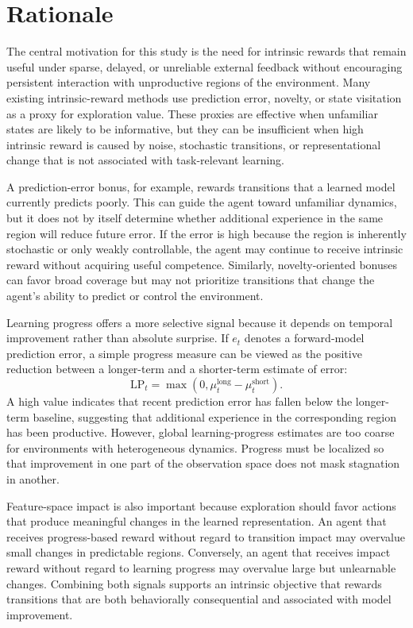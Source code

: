 \section{Rationale}
\label{sec:rationale}

The central motivation for this study is the need for intrinsic rewards that remain useful under sparse, delayed, or unreliable external feedback without encouraging persistent interaction with unproductive regions of the environment.
Many existing intrinsic-reward methods use prediction error, novelty, or state visitation as a proxy for exploration value.
These proxies are effective when unfamiliar states are likely to be informative, but they can be insufficient when high intrinsic reward is caused by noise, stochastic transitions, or representational change that is not associated with task-relevant learning.

A prediction-error bonus, for example, rewards transitions that a learned model currently predicts poorly.
This can guide the agent toward unfamiliar dynamics, but it does not by itself determine whether additional experience in the same region will reduce future error.
If the error is high because the region is inherently stochastic or only weakly controllable, the agent may continue to receive intrinsic reward without acquiring useful competence.
Similarly, novelty-oriented bonuses can favor broad coverage but may not prioritize transitions that change the agent's ability to predict or control the environment.

Learning progress offers a more selective signal because it depends on temporal improvement rather than absolute surprise.
If $e_t$ denotes a forward-model prediction error, a simple progress measure can be viewed as the positive reduction between a longer-term and a shorter-term estimate of error:
\begin{equation}
    \mathrm{LP}_t = \max(0, \mu^{\mathrm{long}}_t - \mu^{\mathrm{short}}_t).
\end{equation}
A high value indicates that recent prediction error has fallen below the longer-term baseline, suggesting that additional experience in the corresponding region has been productive.
However, global learning-progress estimates are too coarse for environments with heterogeneous dynamics.
Progress must be localized so that improvement in one part of the observation space does not mask stagnation in another.

Feature-space impact is also important because exploration should favor actions that produce meaningful changes in the learned representation.
An agent that receives progress-based reward without regard to transition impact may overvalue small changes in predictable regions.
Conversely, an agent that receives impact reward without regard to learning progress may overvalue large but unlearnable changes.
Combining both signals supports an intrinsic objective that rewards transitions that are both behaviorally consequential and associated with model improvement.

